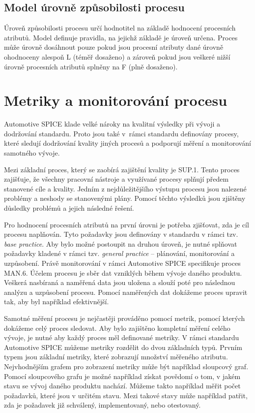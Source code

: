 \documentclass[czech,master]{diploma}
\begin{document}
\subsection{Model úrovně způsobilosti procesu}
Úroveň způsobilosti procesu určí hodnotitel na základě hodnocení procesních atributů. Model definuje  pravidla, na jejichž základě je úroveň určena. Proces může úrovně dosáhnout pouze pokud jsou procesní atributy dané úrovně ohodnoceny alespoň L (téměř dosaženo) a zároveň pokud jsou veškeré nižší úrovně procesních atributů splněny na F (plně dosaženo).


\section{Metriky a monitorování procesu}
Automotive SPICE klade velké nároky na kvalitní výsledky při vývoji a dodržování standardu. Proto jsou také v~rámci standardu definovány procesy, které sledují dodržování kvality jiných procesů a podporují měření a monitorování samotného vývoje. 

Mezi základní proces, který se zaobírá zajištění kvality je SUP.1. Tento proces zajišťuje, že všechny pracovní nástroje a využívané procesy splňují předem stanovené cíle a kvality. Jedním z nejdůležitějšího výstupu procesu jsou nalezené problémy a neshody se stanovenými plány. Pomocí těchto výsledků jsou zjištěny důsledky problémů a jejich následné řešení.

Pro hodnocení procesních atributů na první úrovni je potřeba zjišťovat, zda je cíl procesu naplňován. Tyto požadavky jsou definovány v standardu v rámci tzv. \textit{base practice}. Aby bylo možné postoupit na druhou úroveň, je nutné splňovat požadavky kladené v rámci tzv. \textit{general practice} -- plánování, monitorování a uzpůsobení. Právě monitorování v rámci Automotive SPICE specifikuje proces MAN.6. Účelem procesu je sběr dat vzniklých během vývoje daného produktu. Veškerá nasbíraná a naměřená data jsou uložena a slouží poté pro následnou analýzu a uzpůsobení procesu. Pomocí naměřených dat dokážeme proces upravit tak, aby byl například efektivnější. 

Samotné měření procesu je nejčastěji prováděno pomocí metrik, pomocí kterých dokážeme celý proces sledovat. Aby bylo zajištěno kompletní měření celého vývoje, je nutné aby každý proces měl definované metriky. V rámci standardu Automotive SPICE můžeme metriky rozdělit do dvou základních typů. Prvním typem jsou základní metriky, které zobrazují množství měřeného atributu. Nejvhodnějším grafem pro zobrazení metriky může být například sloupcový graf. Pomocí sloupcového grafu je možné například získat povědomí o tom, v jakém stavu se vývoj daného produktu nachází. Můžeme takto například měřit počet požadavků, které jsou v určitém stavu. Mezi takové stavy může například patřit, zda je požadavek již schválený, implementovaný, nebo otestovaný.
\end{document}
